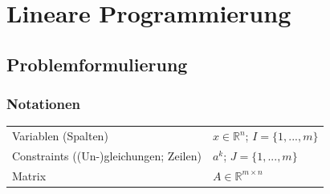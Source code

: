 \section{Lineare Programmierung }

\subsection{Problemformulierung}
  \subsubsection{Notationen}
    \begin{tabular}{p{6cm} l}
      Variablen (Spalten) & $x \in \mathbb{R}^n$; $I = \{1, ..., m\}$ \\
      Constraints ((Un-)gleichungen; Zeilen) & $a^k$; $J = \{1, ..., m\}$ \\
      Matrix & $A \in \mathbb{R}^{m \times n}$
    \end{tabular}
    
